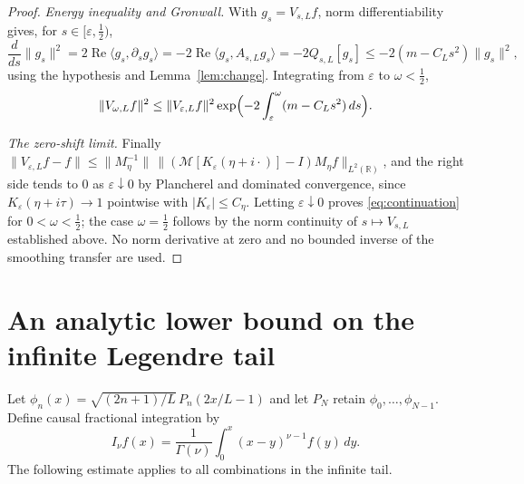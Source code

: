 \documentclass[11pt]{article}
\numberwithin{equation}{section}
\theoremstyle{definition}
\theoremstyle{remark}
\newcommand{\RR}{\mathbb R}
\newcommand{\Rea}{\operatorname{Re}}
\newcommand{\norm}[1]{\lVert#1\rVert}
\newcommand{\ip}[2]{\langle#1,#2\rangle}
\begin{document}
\begin{proof}
\emph{Energy inequality and Gronwall.} With $g_s=V_{s,L}f$, norm
differentiability gives, for $s\in[\varepsilon,\tfrac12)$,
\[
 \frac{d}{ds}\norm{g_s}^2=2\Rea\ip{g_s}{\partial_sg_s}
 =-2\Rea\ip{g_s}{A_{s,L}g_s}=-2Q_{s,L}[g_s]
 \le-2(m-C_Ls^2)\norm{g_s}^2,
\]
using the hypothesis and Lemma~\ref{lem:change}. Integrating from
$\varepsilon$ to $\omega<\tfrac12$,
\[
 \norm{V_{\omega,L}f}^2\le\norm{V_{\varepsilon,L}f}^2
 \exp\Bigl(-2\int_\varepsilon^\omega(m-C_Ls^2)\,ds\Bigr).
\]

\emph{The zero-shift limit.} Finally
$\norm{V_{\varepsilon,L}f-f}\le\norm{M_\eta^{-1}}\,\norm{(\mathcal M[K_\varepsilon(\eta+i\cdot)]-I)M_\eta f}_{L^2(\RR)}$,
and the right side tends to $0$ as $\varepsilon\downarrow0$ by Plancherel and
dominated convergence, since $K_\varepsilon(\eta+i\tau)\to1$ pointwise with
$|K_\varepsilon|\le C_\eta$. Letting $\varepsilon\downarrow0$ proves
\eqref{eq:continuation} for $0<\omega<\tfrac12$; the case $\omega=\tfrac12$
follows by the norm continuity of $s\mapsto V_{s,L}$ established above. No
norm derivative at zero and no bounded inverse of the smoothing transfer are
used.
\end{proof}

\section{An analytic lower bound on the infinite Legendre tail}\label{sec:tail}

Let $\phi_n(x)=\sqrt{(2n+1)/L}\,P_n(2x/L-1)$ and let $P_N$ retain
$\phi_0,\ldots,\phi_{N-1}$. Define causal fractional integration by
\[
 I_\nu f(x)=\frac1{\Gamma(\nu)}\int_0^x(x-y)^{\nu-1}f(y)\,dy.
\]
The following estimate applies to all combinations in the infinite tail.
\end{document}
